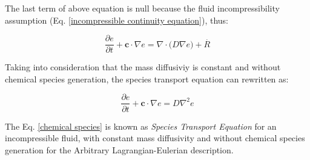 \medskip
The last term of above equation is null because the
fluid incompressibility assumption
(Eq. \ref{incompressible continuity equation}),
thus:

\begin{equation}
 \frac{\partial e}{\partial t}
 +
 \textbf{c} \cdot \nabla e
 =
 \nabla \cdot \big( D \nabla e \big)
 +
 \overset{.}{R}
\end{equation}

\medskip
Taking into consideration that the mass diffusiviy
is constant and without chemical species
generation,
the species transport equation can rewritten as:

\begin{equation} \label{chemical species}
 \frac{\partial e}{\partial t}
 +
 \textbf{c} \cdot \nabla e
 =
 D \nabla^{2} e
\end{equation}

\medskip
The Eq. \ref{chemical species} is known as
\textit{Species Transport Equation}
for an incompressible fluid, with constant mass diffusivity
and without chemical species generation for the
Arbitrary Lagrangian-Eulerian description.
